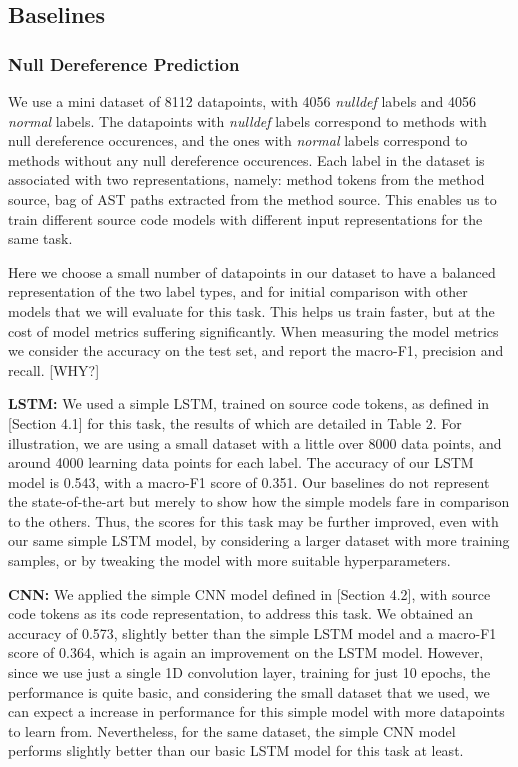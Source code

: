 \documentclass[sigplan,review,anonymous]{acmart}\settopmatter{printfolios=true,printccs=false,printacmref=false}
\begin{document}
\subsection{Baselines}

\subsubsection{Null Dereference Prediction}
We use a mini dataset of 8112 datapoints, with 4056 \textit{nulldef} labels and 4056 \textit{normal} labels. The datapoints with \textit{nulldef} labels correspond to methods with null dereference occurences, and the ones with \textit{normal} labels correspond to methods without any null dereference occurences. Each label in the dataset is associated with two representations, namely: method tokens from the method source, bag of AST paths extracted from the method source. This enables us to train different source code models with different input representations for the same task. 

Here we choose a small number of datapoints in our dataset to have a balanced representation of the two label types, and for initial comparison with other models that we will evaluate for this task. This helps us train faster, but at the cost of model metrics suffering significantly. When measuring the model metrics we consider the accuracy on the test set, and report the macro-F1, precision and recall. [WHY?]   \newline

\noindent
\textbf{LSTM: } We used a simple LSTM, trained on source code tokens, as defined in [Section 4.1] for this task, the results of which are detailed in Table 2. For illustration, we are using a small dataset with a little over 8000 data points, and around 4000 learning data points for each label. The accuracy of our LSTM model is 0.543, with a macro-F1 score of 0.351. Our baselines do not represent the state-of-the-art but merely to show how the simple models fare in comparison to the others. Thus, the scores for this task may be further improved, even with our same simple LSTM model, by considering a larger dataset with more training samples, or by tweaking the model with more suitable hyperparameters. \newline

\noindent
\textbf{CNN: } We applied the simple CNN model defined in [Section 4.2], with source code tokens as its code representation, to address this task. We obtained an accuracy of 0.573, slightly better than the simple LSTM model and a macro-F1 score of 0.364, which is again an improvement on the LSTM model. However, since we use just a single 1D convolution layer, training for just 10 epochs, the performance is quite basic, and considering the small dataset that we used, we can expect a increase in performance for this simple model with more datapoints to learn from. Nevertheless, for the same dataset, the simple CNN model performs slightly better than our basic LSTM model for this task at least. \newline 
\end{document}

